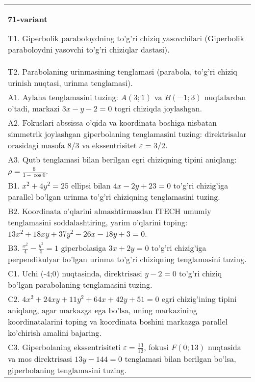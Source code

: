 \documentclass{article}
\begin{document}
\begin{tabular}{m{17cm}}
\textbf{71-variant}
\newline

T1. Giperbolik paraboloydning to'g'ri chiziq yasovchilari (Giperbolik paraboloydni yasovchi to'g'ri chiziqlar dastasi).\\

T2. Parabolaning urinmasining tenglamasi (parabola, to'g'ri chiziq urinish nuqtasi, urinma tenglamasi).\\

A1. Aylana tenglamasini tuzing: $A(3;1)$ va $B(-1;3)$ nuqtalardan o'tadi, markazi $3x-y-2=0$ togri chiziqda joylashgan.\\

A2. Fokuslari abssissa o'qida va koordinata boshiga nisbatan simmetrik joylashgan giperbolaning tenglamasini tuzing: direktrisalar orasidagi masofa $8/3$ va ekssentrisitet $\varepsilon=3/2$.\\

A3. Qutb tenglamasi bilan berilgan egri chiziqning tipini aniqlang: $\rho=\frac{6}{1-\cos 0}$.\\

B1. $x^{2} + 4y^{2} = 25$ ellipsi bilan $4x - 2y + 23 = 0$ to'g'ri chizig'iga parallel bo'lgan urinma to'g'ri chiziqning tenglamasini tuzing.  \\

B2. Koordinata o'qlarini almashtirmasdan ITECH umumiy tenglamasini soddalashtiring, yarim o'qlarini toping: $13x^{2} + 18xy + 37y^{2} - 26x - 18y + 3 = 0$.  \\

B3. $\frac{x^{2}}{4} - \frac{y^{2}}{5} = 1$ giperbolasiga $3x + 2y = 0$ to'g'ri chizig'iga perpendikulyar bo'lgan urinma to'g'ri chiziqning tenglamasini tuzing.\\

C1. Uchi (-4;0) nuqtasinda, direktrisasi $y - 2 = 0$ to'g'ri chiziq bo'lgan parabolaning tenglamasini tuzing.\\

C2. $4x^{2} + 24xy + 11y^{2} + 64x + 42y + 51 = 0$ egri chizig'ining tipini aniqlang, agar markazga ega bo'lsa, uning markazining koordinatalarini toping va koordinata boshini markazga parallel ko'chirish amalini bajaring.\\

C3. Giperbolaning ekssentrisiteti $\varepsilon = \frac{13}{12}$, fokusi $F(0;13)$ nuqtasida va mos direktrisasi $13y - 144 = 0$ tenglamasi bilan berilgan bo'lsa, giperbolaning tenglamasini tuzing.  \\

\end{tabular}
\vspace{1cm}
\end{document}
